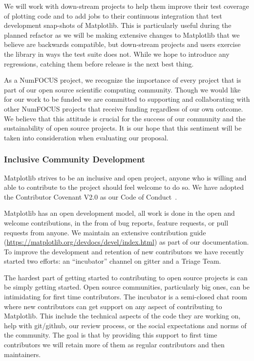 \documentclass[12pt]{article}
\numberwithin{page}{section}
\begin{document}
We will work with down-stream projects to help them improve their test
coverage of plotting code and to add jobs to their continuous
integration that test development snap-shots of Matplotlib.  This is
particularly useful during the planned refactor as we will be making
extensive changes to Matplotlib that we believe are backwards
compatible, but down-stream projects and users exercise the library in
ways the test suite does not.  While we hope to introduce any
regressions, catching them before release is the next best thing.

As a NumFOCUS project, we recognize the importance of every project
that is part of our open source scientific computing community. Though
we would like for our work to be funded we are committed to supporting
and collaborating with other NumFOCUS projects that receive funding
regardless of our own outcome. We believe that this attitude is
crucial for the success of our community and the sustainability of
open source projects. It is our hope that this sentiment will be taken
into consideration when evaluating our proposal.


\subsubsection{Inclusive Community Development}


Matplotlib strives to be an inclusive and open project, anyone who is
willing and able to contribute to the project should feel welcome to
do so.  We have adopted the Contributor Covenant V2.0 as
our Code of Conduct~\cite{CoC}.

Matplotlib has an open development model, all work is done in the open
and welcome contributions, in the from of bug reports, feature
requests, or pull requests from anyone.  We maintain an extensive
contribution guide
(\url{https://matplotlib.org/devdocs/devel/index.html}) as part of our
documentation.  To improve the development and retention of new
contributors we have recently started two efforts: an ``incubator''
channel on gitter and a Triage Team.

%

The hardest part of getting started to contributing to open source
projects is can be simply getting started.  Open source communities,
particularly big ones, can be intimidating for first time
contributors.  The incubator is a semi-closed chat room where new
contributors can get support on any aspect of contributing to
Matplotlib.  This include the technical aspects of the code they are
working on, help with git/github, our review process, or the social
expectations and norms of the community.  The goal is that by
providing this support to first time contributors we will retain more
of them as regular contributors and then maintainers.
\end{document}
